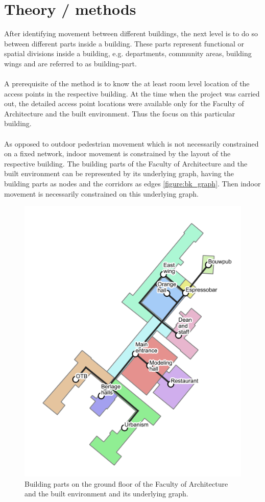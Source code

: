 \section{Theory / methods}\label{11methods}
After identifying movement between different buildings, the next level is to do so between different parts inside a building. These parts represent
functional or spatial divisions inside a building, e.g. departments, community areas, building wings and are referred to as building-part.
\\\\
A prerequisite of the method is to know the at least room level location of the access points in the respective building. At the time when the project
was carried out, the detailed access point locations were available only for the Faculty of Architecture and the built environment. Thus the focus on this particular building.
\\\\
As opposed to outdoor pedestrian movement which is not necessarily constrained on a fixed network, indoor movement is constrained by the layout of the
respective building. The building parts of the Faculty of Architecture and the built environment can be represented by its underlying graph, having the building parts as nodes and the corridors as edges \autoref{figure:bk_graph}. Then indoor movement is necessarily constrained on this underlying graph.
\begin{figure}[H]
\centering
\includegraphics[scale=0.5]{bk_BG_bparts.png}
\captionsetup{justification=centering}
\caption{Building parts on the ground floor of the Faculty of Architecture and the built environment and
its underlying graph.}
\label{figure:bk_graph}
\end{figure}
